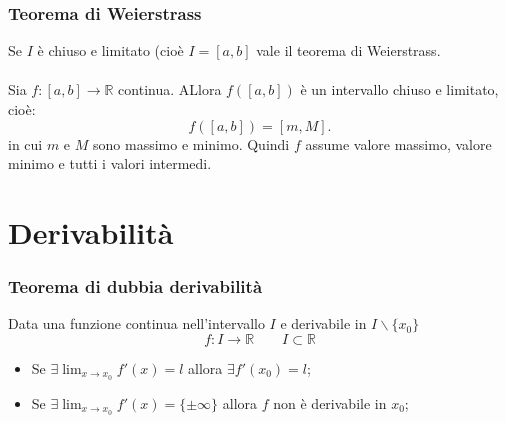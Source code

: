 \documentclass[x11names]{article}
\begin{document}
	
	\begin{center}
		\colorbox{myred}{\begin{minipage}{5.75in}
				\begin{redes}{}
					\subsubsection{Teorema di Weierstrass}
					Se $I$ è chiuso e limitato (cioè $I=\left[a,b\right]$ vale il teorema di Weierstrass.
					\\ \\
					Sia $f:\left[a,b\right] \rightarrow \mathbb{R}$ continua. ALlora $f\left(\left[a,b\right]\right)$ è un intervallo chiuso e limitato, cioè:
					\[
					f\left(\left[a,b\right]\right) = \left[m,M\right]
					.\] 
					in cui $m$ e $M$ sono massimo e minimo. Quindi $f$ assume valore massimo, valore minimo e tutti i valori intermedi.
				\end{redes}
		\end{minipage}}        
	\end{center}
	
	
	
	\newpage
	\section{Derivabilità}
	\begin{center}
		\colorbox{myred}{\begin{minipage}{5.75in}
				\begin{redes}{}
					\subsubsection{Teorema di dubbia derivabilità}
					Data una funzione continua nell'intervallo $I$ e derivabile in $I \backslash\{x_0\}$
					\[
					f: I \to \mathbb{R} \qquad I \subset \mathbb{R}
					\]
					\begin{itemize}
						\item Se $\exists \lim_{x \to x_0}f'(x) = l$ allora $\exists f'(x_0) = l$;
						\item Se $\exists \lim_{x \to x_0}f'(x) = \{\pm \infty\}$ allora $f$ non è derivabile in $x_0$;
					\end{itemize}
				\end{redes}
		\end{minipage}}        
	\end{center}
	
\end{document}
